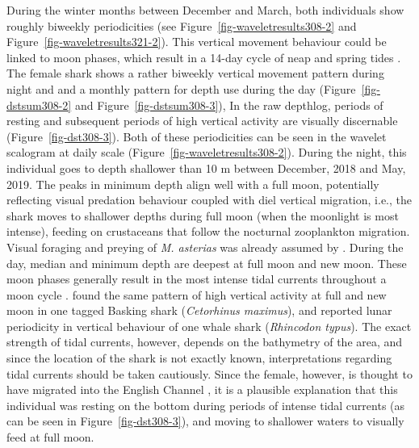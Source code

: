 \documentclass[
  authoryear,
  review,
  3p]{elsarticle}
\begin{document}
During the winter months between December and March, both individuals
show roughly biweekly periodicities (see
Figure~\ref{fig-waveletresults308-2} and
Figure~\ref{fig-waveletresults321-2}). This vertical movement behaviour
could be linked to moon phases, which result in a 14-day cycle of neap
and spring tides \citep{shepard_2006}. The female shark shows a rather
biweekly vertical movement pattern during night and and a monthly
pattern for depth use during the day (Figure~\ref{fig-dstsum308-2} and
Figure~\ref{fig-dstsum308-3}), In the raw depthlog, periods of resting
and subsequent periods of high vertical activity are visually
discernable (Figure~\ref{fig-dst308-3}). Both of these periodicities can
be seen in the wavelet scalogram at daily scale
(Figure~\ref{fig-waveletresults308-2}). During the night, this
individual goes to depth shallower than 10 m between December, 2018 and
May, 2019. The peaks in minimum depth align well with a full moon,
potentially reflecting visual predation behaviour coupled with diel
vertical migration, i.e., the shark moves to shallower depths during
full moon (when the moonlight is most intense), feeding on crustaceans
that follow the nocturnal zooplankton migration. Visual foraging and
preying of \emph{M. asterias} was already assumed by
\citet{griffiths_2020}. During the day, median and minimum depth are
deepest at full moon and new moon. These moon phases generally result in
the most intense tidal currents throughout a moon cycle
\citep{arnold_1994}. \citet{shepard_2006} found the same pattern of high
vertical activity at full and new moon in one tagged Basking shark
(\emph{Cetorhinus maximus}), and \citet{graham_2006} reported lunar
periodicity in vertical behaviour of one whale shark (\emph{Rhincodon
typus}). The exact strength of tidal currents, however, depends on the
bathymetry of the area, and since the location of the shark is not
exactly known, interpretations regarding tidal currents should be taken
cautiously. Since the female, however, is thought to have migrated into
the English Channel \citep[an area with exceptionally high tidal
currents,][]{salomon_1993}, it is a plausible explanation that this
individual was resting on the bottom during periods of intense tidal
currents (as can be seen in Figure~\ref{fig-dst308-3}), and moving to
shallower waters to visually feed at full moon.
\end{document}

